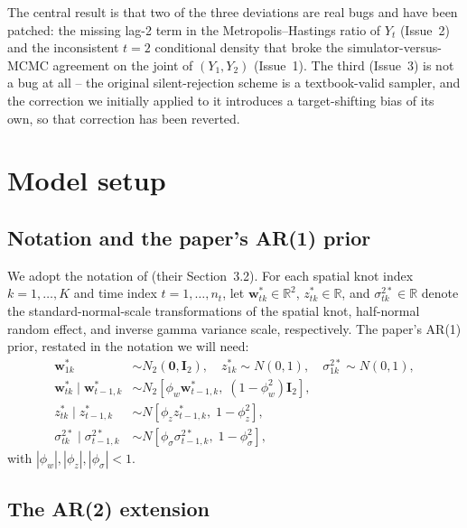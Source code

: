 \documentclass[11pt]{article}
\newcommand{\bw}{\mathbf{w}}
\newcommand{\bI}{\mathbf{I}}
\newcommand{\bZero}{\boldsymbol{0}}
\theoremstyle{plain}
\theoremstyle{definition}
\theoremstyle{remark}
\begin{document}
The central result is that two of the three deviations are real bugs and
have been patched: the missing lag-2 term in the Metropolis--Hastings ratio
of $Y_t$ (Issue~2) and the inconsistent $t = 2$ conditional density that
broke the simulator-versus-MCMC agreement on the joint of $(Y_1, Y_2)$
(Issue~1). The third (Issue~3) is not a bug at all -- the original
silent-rejection scheme is a textbook-valid sampler, and the correction we
initially applied to it introduces a target-shifting bias of its own, so
that correction has been reverted.

\section{Model setup}\label{sec:setup}

\subsection{Notation and the paper's AR(1) prior}\label{sec:notation}

We adopt the notation of \citet*{morris_space-time_2017} (their Section~3.2). For each
spatial knot index $k = 1, \ldots, K$ and time index $t = 1, \ldots, n_t$,
let $\bw^{*}_{tk} \in \mathbb{R}^2$, $z^{*}_{tk} \in \mathbb{R}$, and
$\sigma^{2*}_{tk} \in \mathbb{R}$ denote the standard-normal-scale
transformations of the spatial knot, half-normal random effect, and inverse
gamma variance scale, respectively. The paper's AR(1) prior, restated in
the notation we will need:
\begin{align}
  \bw^{*}_{1k} &\sim N_2(\bZero, \bI_2), \quad
  z^{*}_{1k} \sim N(0, 1), \quad
  \sigma^{2*}_{1k} \sim N(0, 1), \label{eq:ar1-init} \\
  \bw^{*}_{tk} \mid \bw^{*}_{t-1, k} &\sim N_2\!\left[\phi_w \bw^{*}_{t-1, k},\; (1 - \phi_w^2) \bI_2\right], \label{eq:ar1-w} \\
  z^{*}_{tk} \mid z^{*}_{t-1, k} &\sim N\!\left[\phi_z z^{*}_{t-1, k},\; 1 - \phi_z^2\right], \label{eq:ar1-z} \\
  \sigma^{2*}_{tk} \mid \sigma^{2*}_{t-1, k} &\sim N\!\left[\phi_\sigma \sigma^{2*}_{t-1, k},\; 1 - \phi_\sigma^2\right], \label{eq:ar1-sigma}
\end{align}
with $|\phi_w|, |\phi_z|, |\phi_\sigma| < 1$.

\subsection{The AR(2) extension}\label{sec:ar2}
\end{document}
